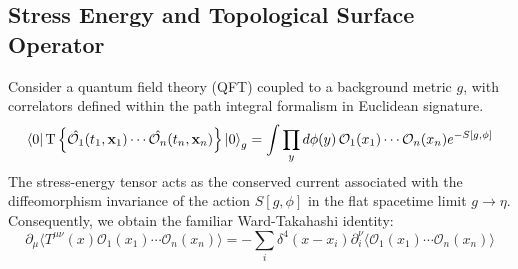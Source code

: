 \documentclass[12pt]{article}
\numberwithin{equation}{section}
\newcommand\<\langle
\renewcommand\>\rangle
\renewcommand\.{\cdot}
\begin{document}
\subsection{Stress Energy and Topological Surface Operator}
Consider a quantum field theory (QFT) coupled to a background metric $g$,  with correlators defined within the path integral formalism in Euclidean signature. 
\begin{equation}
    \bra{0}\text{T}\left\{\hat{\mathcal{O}_1}(t_1,\mathbf{x}_1)\cdots\hat{\mathcal{O}_n}(t_n,\mathbf{x}_n)\right\}\ket{0}_{g} = \int{\prod_{y}d\phi(y)\,\mathcal{O}_1(x_1)\cdots\mathcal{O}_n(x_n)e^{-S[g,\phi]}}
\end{equation}
The stress-energy tensor acts as the conserved current associated with the diffeomorphism invariance of the action $S[g,\phi]$ in the flat spacetime limit $g\rightarrow\eta$.
Consequently, we obtain the familiar Ward-Takahashi identity:
\begin{equation}
    \partial_{\mu}\langle T^{\mu\nu}(x)\mathcal{O}_1(x_1)\cdots\mathcal{O}_n(x_n)\rangle = -\sum_{i}\delta^4(x-x_i)\partial^{\nu}_{i}\langle\mathcal{O}_1(x_1)\cdots\mathcal{O}_n(x_n)\rangle
\end{equation}
\end{document}
